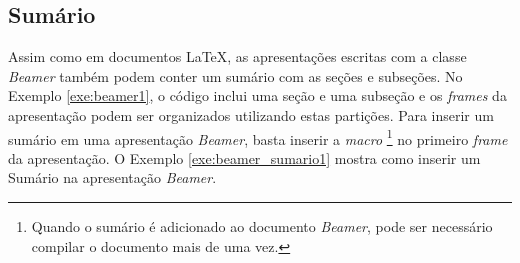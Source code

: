 \subsection{Sumário}
\label{sec:bsumario}

Assim como em documentos \LaTeX{}, as apresentações escritas com a classe \textit{Beamer} também podem conter um sumário com as seções e subseções. No Exemplo \ref{exe:beamer1}, o código inclui uma seção e uma subseção e os \textit{frames} da apresentação podem ser organizados utilizando estas partições. Para inserir um sumário em uma apresentação \textit{Beamer}, basta inserir a \textit{macro} \texttt{\tableofcontents}\footnote{Quando o sumário é adicionado ao documento \textit{Beamer}, pode ser necessário compilar o documento mais de uma vez.} no primeiro \textit{frame} da apresentação. O Exemplo \ref{exe:beamer_sumario1} mostra como inserir um Sumário na apresentação \textit{Beamer}.


